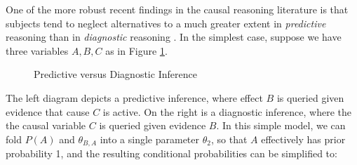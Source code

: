 \documentclass[10pt,letterpaper]{article}
\begin{document}
One of the more robust recent findings in the causal reasoning literature is that subjects tend to neglect alternatives to a much greater extent in \emph{predictive} reasoning than in \emph{diagnostic} reasoning \citep{Fernbach2011,Fernbach2013}. In the simplest case, suppose we have three variables $A,B,C$ as in Figure \ref{diagnostic}.
\begin{figure}[h] \begin{center}
\hspace{.7in}
   \end{center}
 \caption{Predictive versus Diagnostic Inference} \label{diagnostic}
\end{figure}
The left diagram depicts a predictive inference, where effect $B$ is queried given evidence that cause $C$ is active. On the right is a diagnostic inference, where the the causal variable $C$ is queried given evidence $B$. In this simple model, we can fold $P(A)$ and $\theta_{B,A}$ into a single parameter $\theta_2$, so that $A$ effectively has prior probability 1, and the resulting conditional probabilities can be simplified to: 
\end{document}
